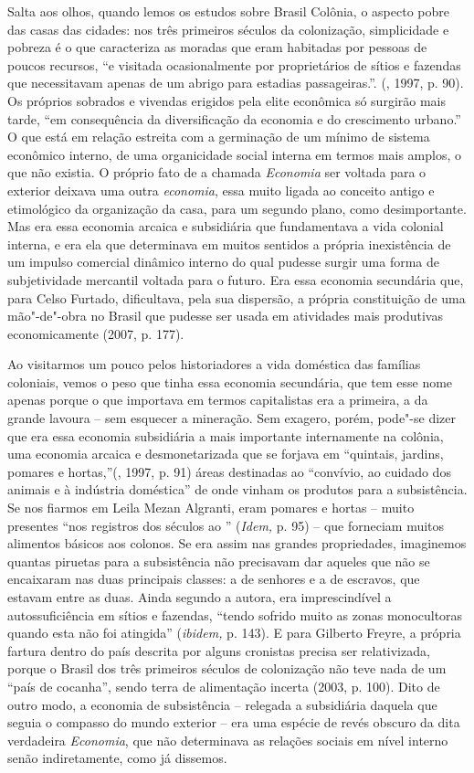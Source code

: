 Salta aos olhos, quando lemos os estudos sobre Brasil Colônia, o aspecto
pobre das casas das cidades: nos três primeiros séculos da colonização,
simplicidade e pobreza é o que caracteriza as moradas que eram habitadas
por pessoas de poucos recursos, ``e visitada ocasionalmente por
proprietários de sítios e fazendas que necessitavam apenas de um abrigo
para estadias passageiras.''. (, 1997, p. 90). Os próprios
sobrados e vivendas erigidos pela elite econômica só surgirão mais
tarde, ``em consequência da diversificação da economia e do crescimento
urbano.'' O que está em relação estreita com a germinação de um mínimo
de sistema econômico interno, de uma organicidade social interna em
termos mais amplos, o que não existia. O próprio fato de a chamada
\emph{Economia} ser voltada para o exterior deixava uma outra
\emph{economia}, essa muito ligada ao conceito antigo e etimológico da
organização da casa, para um segundo plano, como desimportante. Mas era
essa economia arcaica e subsidiária que fundamentava a vida colonial
interna, e era ela que determinava em muitos sentidos a própria
inexistência de um impulso comercial dinâmico interno do qual pudesse
surgir uma forma de subjetividade mercantil voltada para o futuro. Era
essa economia secundária que, para Celso Furtado, dificultava, pela sua
dispersão, a própria constituição de uma mão"-de"-obra no Brasil que
pudesse ser usada em atividades mais produtivas economicamente (2007, p.
177).

Ao visitarmos um pouco pelos historiadores a vida doméstica das famílias
coloniais, vemos o peso que tinha essa economia secundária, que tem esse
nome apenas porque o que importava em termos capitalistas era a
primeira, a da grande lavoura -- sem esquecer a mineração. Sem exagero,
porém, pode"-se dizer que era essa economia subsidiária a mais importante
internamente na colônia, uma economia arcaica e desmonetarizada que se
forjava em ``quintais, jardins, pomares e hortas,''(, 1997, p.
91) áreas destinadas ao ``convívio, ao cuidado dos animais e à indústria
doméstica'' de onde vinham os produtos para a subsistência. Se nos
fiarmos em Leila Mezan Algranti, eram pomares e hortas -- muito
presentes ``nos registros dos séculos  ao '' (\emph{Idem,} p. 95)
-- que forneciam muitos alimentos básicos aos colonos. Se era assim nas
grandes propriedades, imaginemos quantas piruetas para a subsistência
não precisavam dar aqueles que não se encaixaram nas duas principais
classes: a de senhores e a de escravos, que estavam entre as duas. Ainda
segundo a autora, era imprescindível a autossuficiência em sítios e
fazendas, ``tendo sofrido muito as zonas monocultoras quando esta não
foi atingida'' (\emph{ibidem,} p. 143). E para Gilberto Freyre, a
própria fartura dentro do país descrita por alguns cronistas precisa ser
relativizada, porque o Brasil dos três primeiros séculos de colonização
não teve nada de um ``país de cocanha'', sendo terra de alimentação
incerta (2003, p. 100). Dito de outro modo, a economia de subsistência
-- relegada a subsidiária daquela que seguia o compasso do mundo
exterior -- era uma espécie de revés obscuro da dita verdadeira
\emph{Economia}, que não determinava as relações sociais em nível
interno senão indiretamente, como já dissemos.


